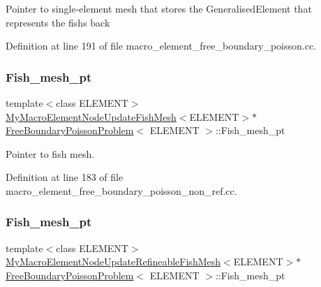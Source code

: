 Pointer to single-\/element mesh that stores the Generalised\+Element that represents the fish\textquotesingle{}s back 

Definition at line 191 of file macro\+\_\+element\+\_\+free\+\_\+boundary\+\_\+poisson.\+cc.

\mbox{\label{classFreeBoundaryPoissonProblem_a625f90221f74269b3ebc8ea6d0035feb}} 
\subsubsection{\texorpdfstring{Fish\+\_\+mesh\+\_\+pt}{Fish\_mesh\_pt}\hspace{0.1cm}{\footnotesize\ttfamily [1/2]}}
{\footnotesize\ttfamily template$<$class E\+L\+E\+M\+E\+NT$>$ \\
\hyperlink{classMyMacroElementNodeUpdateFishMesh}{My\+Macro\+Element\+Node\+Update\+Fish\+Mesh}$<$E\+L\+E\+M\+E\+NT$>$$\ast$ \hyperlink{classFreeBoundaryPoissonProblem}{Free\+Boundary\+Poisson\+Problem}$<$ E\+L\+E\+M\+E\+NT $>$\+::Fish\+\_\+mesh\+\_\+pt\hspace{0.3cm}{\ttfamily [private]}}



Pointer to fish mesh. 



Definition at line 183 of file macro\+\_\+element\+\_\+free\+\_\+boundary\+\_\+poisson\+\_\+non\+\_\+ref.\+cc.

\mbox{\label{classFreeBoundaryPoissonProblem_ae81a7e22c2c61854696b80a94053a663}} 
\subsubsection{\texorpdfstring{Fish\+\_\+mesh\+\_\+pt}{Fish\_mesh\_pt}\hspace{0.1cm}{\footnotesize\ttfamily [2/2]}}
{\footnotesize\ttfamily template$<$class E\+L\+E\+M\+E\+NT$>$ \\
\hyperlink{classMyMacroElementNodeUpdateRefineableFishMesh}{My\+Macro\+Element\+Node\+Update\+Refineable\+Fish\+Mesh}$<$E\+L\+E\+M\+E\+NT$>$$\ast$ \hyperlink{classFreeBoundaryPoissonProblem}{Free\+Boundary\+Poisson\+Problem}$<$ E\+L\+E\+M\+E\+NT $>$\+::Fish\+\_\+mesh\+\_\+pt\hspace{0.3cm}{\ttfamily [private]}}



